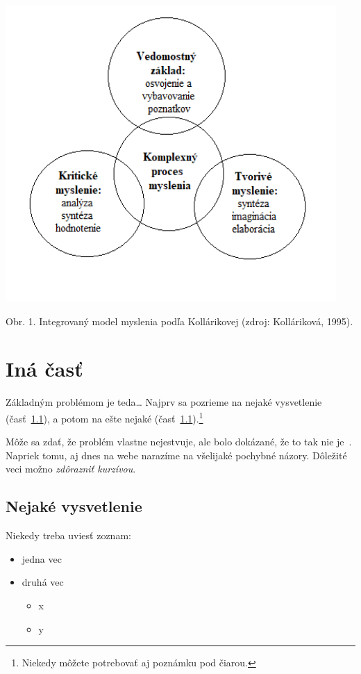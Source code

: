 \documentclass[10pt,oneside,slovak,a4paper]{article}
\begin{document}
\includegraphics{RKM graf}

Obr. 1. Integrovaný model myslenia podľa Kollárikovej (zdroj: Kolláriková, 1995).\cite{KritickeATvoriveMyslenie}

\section{Iná časť} \label{ina}

Základným problémom je teda\ldots{} Najprv sa pozrieme na nejaké vysvetlenie (časť~\ref{ina:nejake}), a potom na ešte nejaké (časť~\ref{ina:nejake}).\footnote{Niekedy môžete potrebovať aj poznámku pod čiarou.}

Môže sa zdať, že problém vlastne nejestvuje\cite{Coplien:MPD}, ale bolo dokázané, že to tak nie je~\cite{Czarnecki:Staged, Czarnecki:Progress}. Napriek tomu, aj dnes na webe narazíme na všelijaké pochybné názory\cite{PLP-Framework}. Dôležité veci možno \emph{zdôrazniť kurzívou}. \cite{PLP-Framework}


\subsection{Nejaké vysvetlenie} \label{ina:nejake}

Niekedy treba uviesť zoznam:

\begin{itemize}
\item jedna vec
\item druhá vec
	\begin{itemize}
	\item x
	\item y
	\end{itemize}
\end{itemize}
\end{document}
